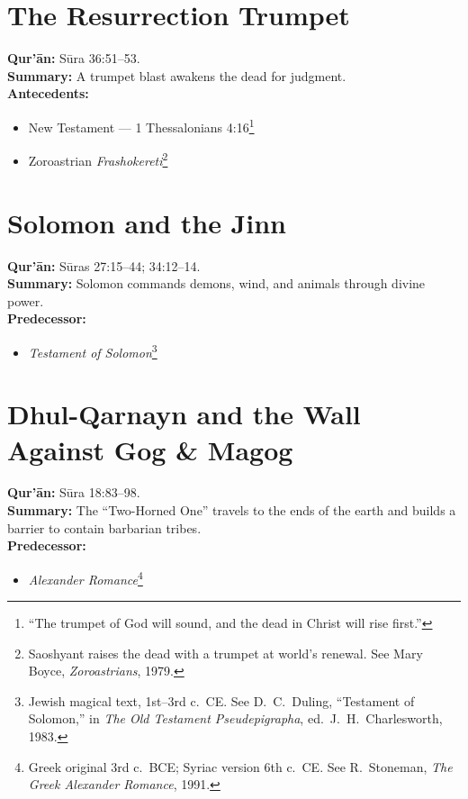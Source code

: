 \documentclass[11pt,a4paper]{article}
\begin{document}
\section{The Resurrection Trumpet}
\textbf{Qur’ān:} Sūra 36:51–53.\\
\textbf{Summary:} A trumpet blast awakens the dead for judgment.\\
\textbf{Antecedents:}
\begin{itemize}
  \item New Testament — 1 Thessalonians 4:16\footnote{“The trumpet of God will sound, and the dead in Christ will rise first.”}
  \item Zoroastrian \emph{Frashokereti}\footnote{Saoshyant raises the dead with a trumpet at world’s renewal. See Mary Boyce, \emph{Zoroastrians}, 1979.}
\end{itemize}

\section{Solomon and the Jinn}
\textbf{Qur’ān:} Sūras 27:15–44; 34:12–14.\\
\textbf{Summary:} Solomon commands demons, wind, and animals through divine power.\\
\textbf{Predecessor:}
\begin{itemize}
  \item \emph{Testament of Solomon}\footnote{Jewish magical text, 1st–3rd c.\ CE. See D.\ C.\ Duling, “Testament of Solomon,” in \emph{The Old Testament Pseudepigrapha}, ed.\ J.\ H.\ Charlesworth, 1983.}
\end{itemize}

\section{Dhul-Qarnayn and the Wall Against Gog \& Magog}
\textbf{Qur’ān:} Sūra 18:83–98.\\
\textbf{Summary:} The “Two-Horned One” travels to the ends of the earth and builds a barrier to contain barbarian tribes.\\
\textbf{Predecessor:}
\begin{itemize}
  \item \emph{Alexander Romance}\footnote{Greek original 3rd c.\ BCE; Syriac version 6th c.\ CE. See R.\ Stoneman, \emph{The Greek Alexander Romance}, 1991.}
\end{itemize}
\end{document}
